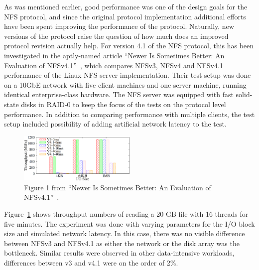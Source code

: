 As was mentioned earlier, good performance was one of the design goals for the NFS protocol,
and since the original protocol implementation additional efforts have been spent improving the performance of the protocol.
Naturally, new versions of the protocol raise the question of how much does an improved protocol revision actually help.
For version 4.1 of the NFS protocol, this has been investigated in the aptly-named article ``Newer Is Sometimes Better: An Evaluation of NFSv4.1''~\cite{NFSv4Better}, which compares NFSv3, NFSv4 and NFSv4.1 performance of the Linux NFS server implementation.
Their test setup was done on a 10GbE network with five client machines and one server machine, running identical enterprise-class hardware.
The NFS server was equipped with fast solid-state disks in RAID-0 to keep the focus of the tests on the protocol level performance.
In addition to comparing performance with multiple clients, the test setup included possibility of adding artificial network latency to the test.

\begin{figure}[h]
\centering\includegraphics[width=0.5\textwidth]{images/nfsv41better-random-read-throughput.png}
\caption{Figure 1 from ``Newer Is Sometimes Better: An Evaluation of NFSv4.1''~\cite{NFSv4Better}.}
\label{fig:NFSv41ReadThroughput}
\end{figure}

Figure~\ref{fig:NFSv41ReadThroughput} shows throughput numbers of reading a 20 GB file with 16 threads for five minutes.
The experiment was done with varying parameters for the I/O block size and simulated network latency.
In this case, there was no visible difference between NFSv3 and NFSv4.1 as either the network or the disk array was the bottleneck.
Similar results were observed in other data-intensive workloads,
differences between v3 and v4.1 were on the order of 2\%.


